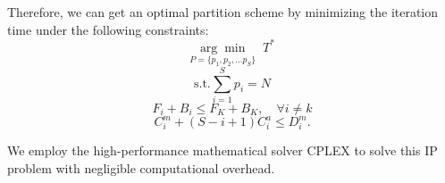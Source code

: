 \documentclass[conference]{IEEEtran}
\begin{document}
Therefore, we can get an optimal partition scheme by minimizing the iteration time under the following constraints:
\begin{equation}
    \underset{P=\{p_1, p_2,...p_S\}}{\arg\min} \;\; T^*
\end{equation}
\begin{equation} \label{cons:chunk}
    \text{s.t.} \sum_{i=1}^{S} p_i = N
\end{equation}
\begin{equation} \label{cons:k}
    F_i+ B_i \leq F_K + B_K, \quad \forall i \neq k
\end{equation}
\begin{equation} \label{cons:mem}
    C_i^m + (S - i + 1) C_{i}^a \leq D_i^m.
\end{equation}

We employ the high-performance mathematical solver CPLEX\cite{cplex2009v12} to solve this IP problem with negligible computational overhead.


 
\end{document}
